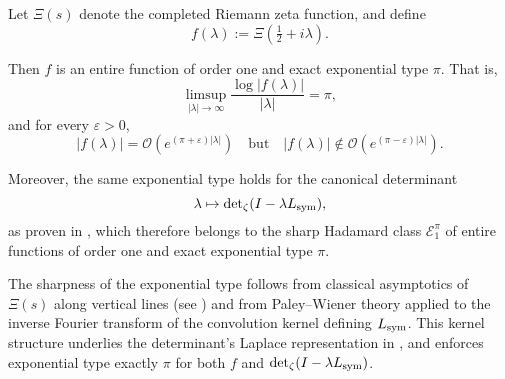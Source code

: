 \begin{lemma}
\label{lem:exact_type_pi}
Let \( \Xi(s) \) denote the completed Riemann zeta function, and define
\[
f(\lambda) := \Xi\left( \tfrac{1}{2} + i\lambda \right).
\]

Then \( f \) is an entire function of order one and exact exponential type \( \pi \). That is,
\[
\limsup_{|\lambda| \to \infty} \frac{\log |f(\lambda)|}{|\lambda|} = \pi,
\]
and for every \( \varepsilon > 0 \),
\[
|f(\lambda)| = \mathcal{O}\left( e^{(\pi + \varepsilon)|\lambda|} \right)
\quad \text{but} \quad
|f(\lambda)| \notin \mathcal{O}\left( e^{(\pi - \varepsilon)|\lambda|} \right).
\]

\medskip
\noindent
Moreover, the same exponential type holds for the canonical determinant
\[
\lambda \mapsto \det\nolimits_\zeta(I - \lambda L_{\mathrm{sym}}),
\]
as proven in , which therefore belongs to the sharp Hadamard class \( \mathcal{E}_1^\pi \) of entire functions of order one and exact exponential type \( \pi \).

\medskip
\noindent
The sharpness of the exponential type follows from classical asymptotics of \( \Xi(s) \) along vertical lines (see ) and from Paley--Wiener theory applied to the inverse Fourier transform of the convolution kernel defining \( L_{\mathrm{sym}} \). This kernel structure underlies the determinant’s Laplace representation in , and enforces exponential type exactly \( \pi \) for both \( f \) and \( \det\nolimits_{\zeta}(I - \lambda L_{\mathrm{sym}}) \).
\end{lemma}

